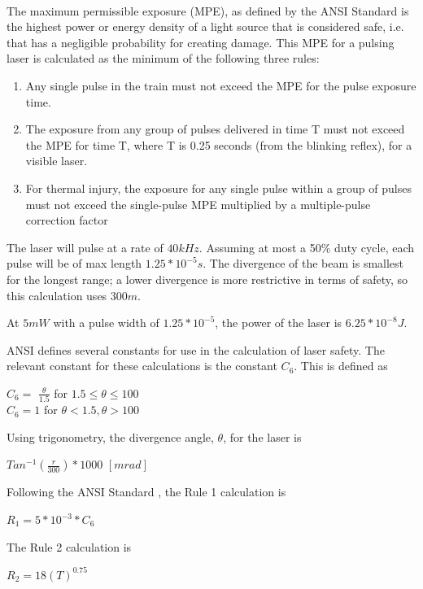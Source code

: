 \documentclass[letterpaper,10pt]{article}
\begin{document}
\begin{spacing}{1.15}
The maximum permissible exposure (MPE), as defined by the ANSI Standard \textsuperscript{\cite{ANSI}} is the highest power or energy density of a light source that is considered safe, i.e. that has a negligible probability for creating damage. This MPE for a pulsing laser is calculated as the minimum of the following three rules:

\begin{enumerate}
	\item Any single pulse in the train must not exceed the MPE for the pulse exposure time.
	\item The exposure from any group of pulses delivered in time T must not exceed the MPE for
	time T, where T is 0.25 seconds (from the blinking reflex), for a visible laser. 
	\item For thermal injury, the exposure for any single pulse within a group of pulses must not
	exceed the single-pulse MPE multiplied by a multiple-pulse correction factor
\end{enumerate}

The laser will pulse at a rate of $40 kHz$. Assuming at most a 50\% duty cycle, each pulse will be of max length $1.25*10^{-5} s$. The divergence of the beam is smallest for the longest range; a lower divergence is more restrictive in terms of safety, so this calculation uses $300m$. 

At $5mW$ with a pulse width of $1.25*10^{-5}$, the power of the laser is $6.25*10^{-8} J$. 

ANSI defines several constants for use in the calculation of laser safety. The relevant constant for these calculations is the constant $C_6$. This is defined as 
\begin{center}
	\large
	$C_6 =$
	$\frac{\theta}{1.5}$ for $1.5 \leq \theta \leq 100$\\
	$C_6 = 1$ for $\theta < 1.5, \theta > 100$
\end{center}

Using trigonometry, the divergence angle, $\theta$, for the laser is 
\begin{center}
	\large
	$Tan^{-1}(\frac{r}{300})* 1000$ $[mrad]$
\end{center}

Following the ANSI Standard \cite{ANSI}, the Rule 1 calculation is 
\begin{center}
	\large
    $R_1 = 5*10^{-3} * C_6$
\end{center}

The Rule 2 calculation is
\begin{center}
	\large
	$R_2 = 18 (T)^{0.75}$
\end{center}


\end{spacing}
\end{document}
